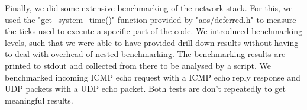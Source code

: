 Finally, we did some extensive benchmarking of the network stack. For this, we used the "get\_system\_time()" function provided by "aos/deferred.h" to measure the ticks used to execute a specific part of the code. We introduced benchmarking levels, such that we were able to have provided drill down results without having to deal with overhead of nested benchmarking.
The benchmarking results are printed to stdout and collected from there to be analysed by a script.
We benchmarked incoming ICMP echo request with a ICMP echo reply response and UDP packets with a UDP echo packet. Both tests are don't repeatedly to get meaningful results.


